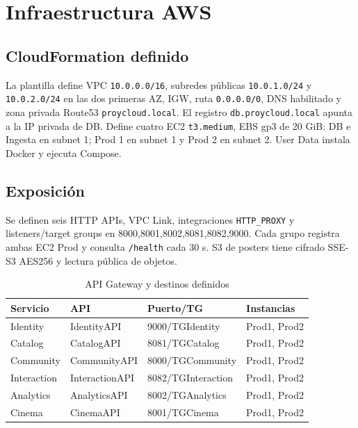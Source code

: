 \chapter{Infraestructura AWS}\section{CloudFormation definido}La plantilla define VPC \texttt{10.0.0.0/16}, subredes públicas \texttt{10.0.1.0/24} y \texttt{10.0.2.0/24} en las dos primeras AZ, IGW, ruta \texttt{0.0.0.0/0}, DNS habilitado y zona privada Route53 \texttt{proycloud.local}. El registro \texttt{db.proycloud.local} apunta a la IP privada de DB. Define cuatro EC2 \texttt{t3.medium}, EBS gp3 de 20 GiB: DB e Ingesta en subnet 1; Prod 1 en subnet 1 y Prod 2 en subnet 2. User Data instala Docker y ejecuta Compose.\section{Exposición}Se definen seis HTTP APIs, VPC Link, integraciones \texttt{HTTP\_PROXY} y listeners/target groups en 8000,8001,8002,8081,8082,9000. Cada grupo registra ambas EC2 Prod y consulta \texttt{/health} cada 30 s. S3 de posters tiene cifrado SSE-S3 AES256 y lectura pública de objetos.\begin{table}[H]\centering\caption{API Gateway y destinos definidos}\begin{tabularx}{\textwidth}{l l l X}\toprule Servicio&API&Puerto/TG&Instancias\\\midrule Identity&IdentityAPI&9000/TGIdentity&Prod1, Prod2\\Catalog&CatalogAPI&8081/TGCatalog&Prod1, Prod2\\Community&CommunityAPI&8000/TGCommunity&Prod1, Prod2\\Interaction&InteractionAPI&8082/TGInteraction&Prod1, Prod2\\Analytics&AnalyticsAPI&8002/TGAnalytics&Prod1, Prod2\\Cinema&CinemaAPI&8001/TGCinema&Prod1, Prod2\\\bottomrule\end{tabularx}\end{table}
